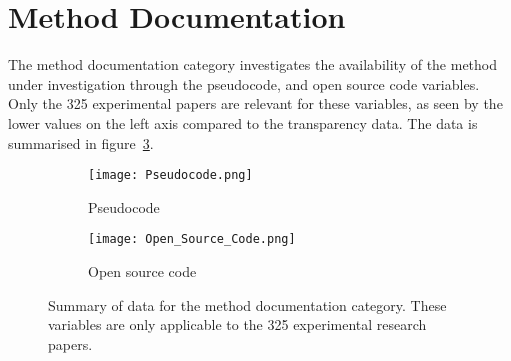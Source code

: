 \section{Method Documentation}
The method documentation category investigates the availability of the method under investigation through the pseudocode, and open source code variables. Only the 325 experimental papers are relevant for these variables, as seen by the lower values on the left axis compared to the transparency data. The data is summarised in figure~\ref{fig:method_documentation}.

\begin{figure}[!h]
\begin{center}
    \begin{subfigure}[b]{0.4\textwidth}
        \texttt{[image: Pseudocode.png]}
        \caption{Pseudocode}
        \label{fig:pseudocode}
    \end{subfigure}
    \begin{subfigure}[b]{0.4\textwidth}
        \texttt{[image: Open\_Source\_Code.png]}
        \caption{Open source code}
        \label{fig:open_source_code}
    \end{subfigure}
    \caption[Summary of method documentation data.]{Summary of data for the method documentation category. These variables are only applicable to the 325 experimental research papers.}
    \label{fig:method_documentation}
\end{center}
\end{figure}

